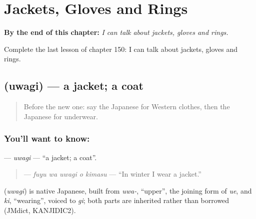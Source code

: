 
\chapter{Jackets, Gloves and Rings}
\label{ch:ja-jackets-gloves-and-rings}

\begin{chapteropening}
\textbf{By the end of this chapter:} \emph{I can talk about jackets, gloves and rings.}

Complete the last lesson of chapter 150: I can talk about jackets, gloves and rings.
\end{chapteropening}

\section[\texorpdfstring{\ja{うわぎ} (uwagi)}{うわぎ (uwagi)}]{ (uwagi) — a jacket; a coat}

\label{lesson:JA-C150-uwagi}



\begin{quote}
Before the new one: say the Japanese for Western clothes, then the Japanese for underwear.
\end{quote}

\subsection*{You'll want to know: }
\textbf{} — \emph{uwagi} — \textquotedblleft{}a jacket; a coat\textquotedblright{}.

\begin{quote}
\textbf{  } — \emph{fuyu wa uwagi o kimasu} — \textquotedblleft{}In winter I wear a jacket.\textquotedblright{}
\end{quote}

\begin{cousinweb}
\textbf{} (\emph{uwagi}) is native Japanese, built from \emph{uwa-}, \textquotedblleft{}upper\textquotedblright{}, the joining form of \emph{ue}, and \emph{ki}, \textquotedblleft{}wearing\textquotedblright{}, voiced to \emph{gi}; both parts are inherited rather than borrowed (JMdict, KANJIDIC2).
\end{cousinweb}

